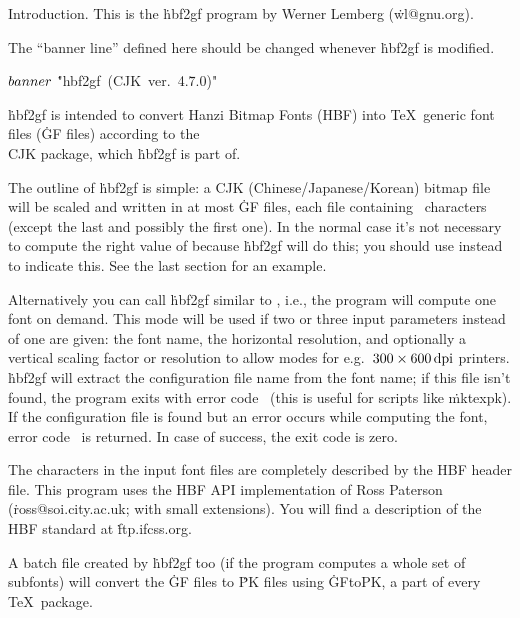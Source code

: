 \def\msdos{\.{msdos}}





Introduction.
This is the \.{hbf2gf} program by Werner Lemberg
(\.{wl@gnu.org}).

The ``banner line'' defined here should be changed whenever \.{hbf2gf} is
modified.

\Y\B\4\D$\\{banner}$ \5
\.{"hbf2gf\ (CJK\ ver.\ 4.}\)\.{7.0)"}\par
\fi

\.{hbf2gf} is intended to convert Hanzi Bitmap Fonts (HBF) into \TeX\
generic font files (\.{GF} files) according to the \\{CJK} package, which
\.{hbf2gf} is part of.

The outline of \.{hbf2gf} is simple: a CJK (Chinese/Japanese/Korean) bitmap
file will be scaled and written in at most \PB{\\{nmb\_files}} \.{GF} files,
each
file containing ~characters (except the last and possibly the first
one). In the normal case it's not necessary to compute the right value of
\PB{\\{nmb\_files}} because \.{hbf2gf} will do this; you should use \PB{${-}%
\T{1}$} instead to
indicate this. See the last section for an example.

Alternatively you can call \.{hbf2gf} similar to \mf, i.e., the program will
compute one font on demand. This mode will be used if two or three input
parameters instead of one are given: the font name, the horizontal
resolution, and optionally a vertical scaling factor or resolution to allow
modes for e.g.\ $300\times600\,\hbox{dpi}$ printers. \.{hbf2gf} will extract
the configuration file name from the font name; if this file isn't found,
the program exits with error code~\PB{\T{2}} (this is useful for scripts like
\.{mktexpk}). If the configuration file is found but an error occurs while
computing the font, error code~\PB{\T{1}} is returned. In case of success, the
exit
code is zero.

The characters in the input font files are completely described by the HBF
header file. This program uses the HBF API implementation of Ross Paterson
(\.{ross@soi.city.ac.uk}; with small extensions). You will find a
description of the HBF standard at \.{ftp.ifcss.org}.

A batch file created by \.{hbf2gf} too (if the program computes a whole set
of subfonts) will convert the \.{GF} files to \.{PK} files using
\.{GFtoPK}, a part of every \TeX\ package.

